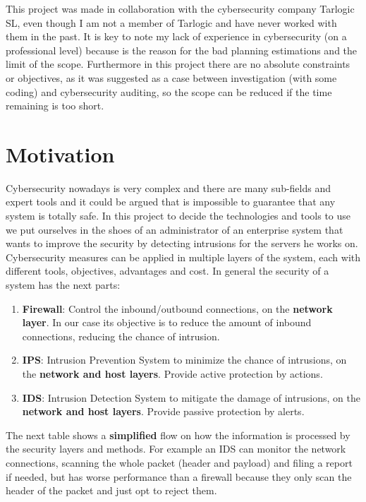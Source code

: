 


This project was made in collaboration with the cybersecurity company Tarlogic SL, even though I am not a member of Tarlogic and have never worked with them in the past. It is key to note my lack of experience in cybersecurity (on a professional level) because is the reason for the bad planning estimations and the limit of the scope. Furthermore in this project there are no absolute constraints or objectives, as it was suggested as a case between investigation (with some coding) and cybersecurity auditing, so the scope can be reduced if the time remaining is too short.

\section{Motivation}

Cybersecurity nowadays is very complex and there are many sub-fields and expert tools and it could be argued that is impossible to guarantee that any system is totally safe. In this project to decide the technologies and tools to use we put ourselves in the shoes of an administrator of an enterprise system that wants to improve the security by detecting intrusions for the servers he works on.
\linej
\linej
Cybersecurity measures can be applied in multiple layers of the system, each with different tools, objectives, advantages and cost. In general the security of a system has the next parts:
\begin{enumerate}
	\item \textbf{Firewall}: Control the inbound/outbound connections, on the \textbf{network layer}. In our case its objective is to reduce the amount of inbound connections, reducing the chance of intrusion.
	\item \textbf{IPS}: Intrusion Prevention System to minimize the chance of intrusions, on the \textbf{network and host layers}. Provide active protection by actions.
	\item \textbf{IDS}: Intrusion Detection System to mitigate the damage of intrusions, on the \textbf{network and host layers}. Provide passive protection by alerts.
\end{enumerate}

\linej
The next table shows a \textbf{simplified} flow on how the information is processed by the security layers and methods. For example an IDS can monitor the network connections, scanning the whole packet (header and payload) and filing a report if needed, but has worse performance than a firewall because they only scan the header of the packet and just opt to reject them\cite{firewall-ipds-ids_comparison}.

